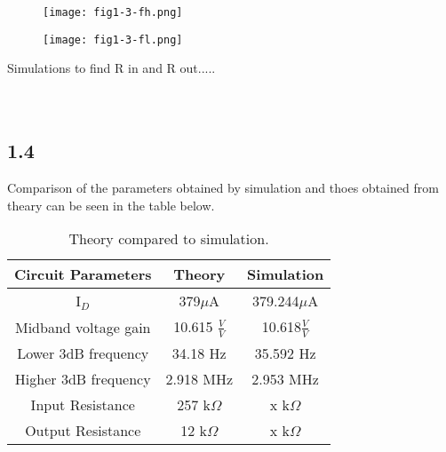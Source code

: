   \begin{figure}[h!]
        \centering
        \texttt{[image: fig1-3-fh.png]}
  \end{figure}

  \begin{figure}[h!]
        \centering
        \texttt{[image: fig1-3-fl.png]}
  \end{figure}

  Simulations to find R in and R out.....\\\\\\



\pagebreak
\subsection*{1.4}

  Comparison of the parameters obtained by simulation and thoes obtained from theary can be seen in the table below.\\

  \begin{table}[htbp]
     \centering
       \begin{tabular}{ c | c | c }
        \hline
         Circuit Parameters     &   Theory                  & Simulation \\
       \hline
        I$_D$                   &   379$\mu$A               &   379.244$\mu$A\\
        Midband voltage gain    &   10.615 $\frac{V}{V}$    &   10.618$\frac{V}{V}$\\
        Lower 3dB frequency     &   34.18 Hz                &   35.592 Hz\\
        Higher 3dB frequency    &   2.918 MHz               &   2.953 MHz\\
        Input Resistance        &   257 k$\Omega$           &   x k$\Omega$\\
        Output Resistance       &   12 k$\Omega$            &   x k$\Omega$\\
       \end{tabular}%
     \caption{Theory compared to simulation.}
     \label{tab:addlabel}%
    \end{table}%
  